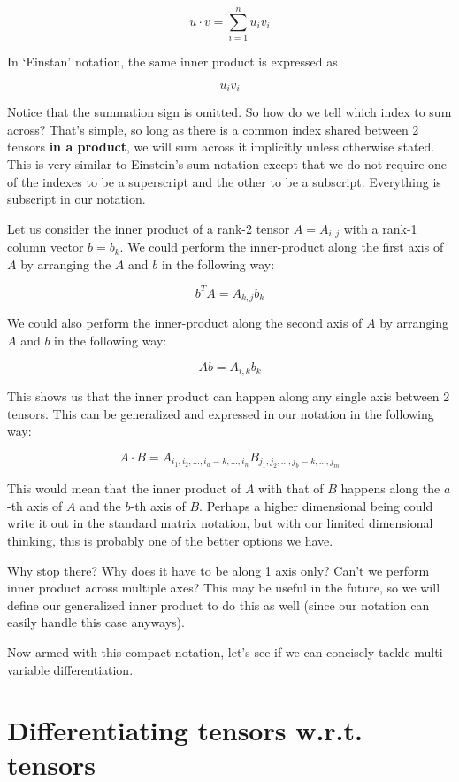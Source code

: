 \documentclass{article}
\begin{document}
\[u \cdot v = \sum_{i=1}^n u_iv_i\]

In `Einstan' notation, the same inner product is expressed as

\[u_iv_i\]

Notice that the summation sign is omitted. So how do we tell which index to sum across? That's simple, so long as there is a common index shared between 2 tensors \textbf{in a product}, we will sum across it implicitly unless otherwise stated. This is very similar to Einstein's sum notation except that we do not require one of the indexes to be a superscript and the other to be a subscript. Everything is subscript in our notation.

Let us consider the inner product of a rank-2 tensor \(A = A_{i,j}\) with a rank-1 column vector \(b = b_k\). We could perform the inner-product along the first axis of \(A\) by arranging the \(A\) and \(b\) in the following way:

\[b^TA = A_{k,j}b_k\]

We could also perform the inner-product along the second axis of \(A\) by arranging \(A\) and \(b\) in the following way:

\[Ab = A_{i, k}b_k\]

This shows us that the inner product can happen along any single axis between 2 tensors. This can be generalized and expressed in our notation in the following way:

\[A \cdot B = A_{i_1, i_2, \dots, i_a = k, \dots, i_n}B_{j_1, j_2, \dots, j_b = k, \dots, j_m}\]

This would mean that the inner product of \(A\) with that of \(B\) happens along the \(a\)-th axis of \(A\) and the \(b\)-th axis of \(B\). Perhaps a higher dimensional being could write it out in the standard matrix notation, but with our limited dimensional thinking, this is probably one of the better options we have.

Why stop there? Why does it have to be along 1 axis only? Can't we perform inner product across multiple axes? This may be useful in the future, so we will define our generalized inner product to do this as well (since our notation can easily handle this case anyways).

Now armed with this compact notation, let's see if we can concisely tackle multi-variable differentiation.

\section{Differentiating tensors w.r.t. tensors}
\end{document}

